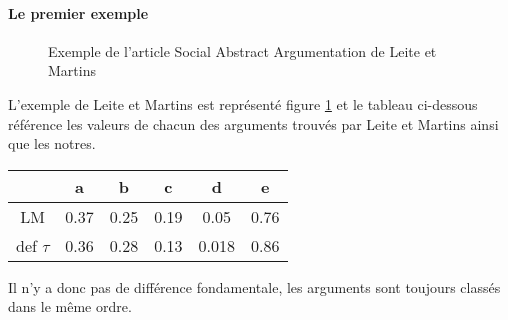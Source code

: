\documentclass[12pt]{article}
\theoremstyle{defi}
\theoremstyle{not}
\theoremstyle{prob}
\begin{document}
        \paragraph{Le premier exemple\\}

          \begin{figure}
            \centering
            \caption{Exemple de l'article Social Abstract Argumentation de Leite et Martins}
            \label{fig:LM_example}
          \end{figure}

          L'exemple de Leite et Martins est représenté figure \ref{fig:LM_example} et le tableau ci-dessous référence les valeurs de chacun des arguments trouvés par Leite et Martins ainsi que les notres.

          \begin{tabular}{|c|c|c|c|c|c|}
            \hline
                       & a    & b    & c    & d     & e \\
            \hline
            LM         & 0.37 & 0.25 & 0.19 & 0.05  & 0.76 \\
            \hline
            def $\tau$ & 0.36 & 0.28 & 0.13 & 0.018 & 0.86\\
            \hline
          \end{tabular}

          Il n'y a donc pas de différence fondamentale, les arguments sont toujours classés dans le même ordre.
\end{document}
